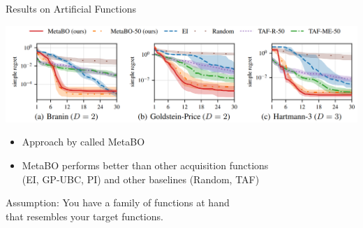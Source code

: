 \begin{frame}[c]{Results on Artificial Functions }

\includegraphics[width=1.0\textwidth]{images/l2acq_results.png}

\medskip

\begin{itemize}
\item Approach by  called MetaBO
\item MetaBO performs better than other acquisition functions\\ (EI, GP-UBC, PI) and other baselines (Random, TAF)
\end{itemize}

\pause

\alert{Assumption}: You have a family of functions at hand\\ that resembles your target functions.

\end{frame}



